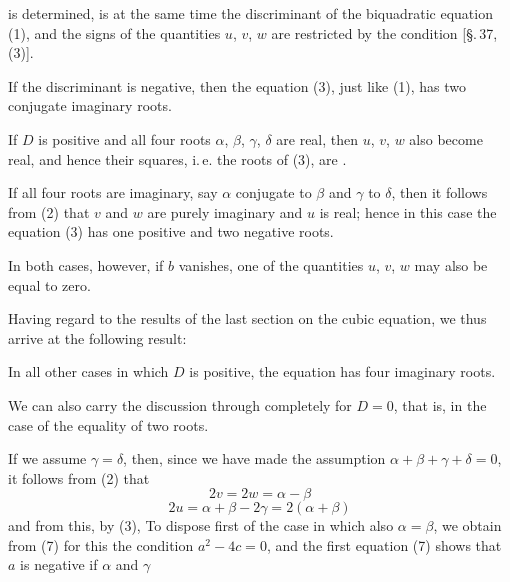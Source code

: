 is determined, is at the same time the discriminant of the biquadratic equation (1), and the signs of the quantities $u$, $v$, $w$ are restricted by the condition
[\S.\,37, (3)].

If the discriminant is negative, then the equation (3), just like (1), has two conjugate imaginary roots.

If $D$ is positive and all four roots $\alpha$, $\beta$, $\gamma$, $\delta$ are real, then $u$, $v$, $w$ also become real, and hence their squares, i.\,e. the roots of (3), are .

If all four roots are imaginary, say $\alpha$ conjugate to $\beta$ and $\gamma$ to $\delta$, then it follows from (2) that $v$ and $w$ are purely imaginary and $u$ is real; hence in this case the equation (3) has one positive and two negative roots.

In both cases, however, if $b$ vanishes, one of the quantities $u$, $v$, $w$ may also be equal to zero.

Having regard to the results of the last section on the cubic equation, we thus arrive at the following result:


In all other cases in which $D$ is positive, the equation has four imaginary roots.

We can also carry the discussion through completely for $D=0$, that is, in the case of the equality of two roots.

If we assume $\gamma = \delta$, then, since we have made the assumption $\alpha+\beta+\gamma+\delta = 0$, it follows from (2) that
\[
2v = 2w = \alpha - \beta
\]
\[
2u = \alpha+\beta-2\gamma = 2(\alpha+\beta)
\]
and from this, by (3),
To dispose first of the case in which also $\alpha=\beta$, we obtain from (7) for this the condition $a^2-4c=0$, and the first equation (7) shows that $a$ is negative if $\alpha$ and $\gamma$
